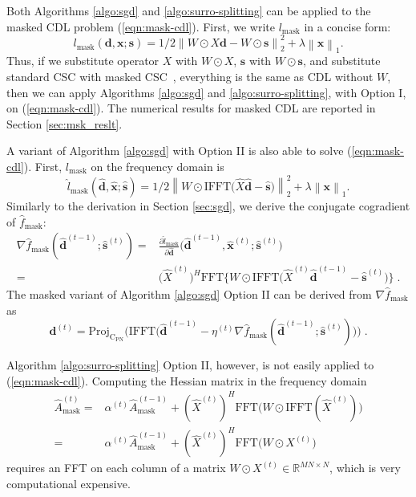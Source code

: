 \documentclass[final]{siamart1116}
\newcommand{\mb}[1]{\mathbf{#1}}
\providecommand{\norm}[1]{\left\lVert#1\right\rVert}
\def \R  {\mathbb{R}}
\begin{document}
Both Algorithms \ref{algo:sgd} and \ref{algo:surro-splitting} can be applied to the masked CDL problem (\ref{eqn:mask-cdl}). First, we write $l_{\text{mask}}$ in a concise form:
\[
l_{\text{mask}}(\mb{d},\mb{x};\mb{s}) = 1/2\norm{W\odot X \mb{d} - W\odot \mb{s}}_2^2 + \lambda\norm{\mb{x}}_1.
\]
Thus, if we substitute operator $X$ with $W\odot X$, $\mb{s}$ with $W\odot \mb{s}$, and substitute standard CSC with masked CSC~\cite{heide-2015-fast, wohlberg-2016-boundary}, everything is the same as CDL without $W$, then we can apply Algorithms \ref{algo:sgd} and \ref{algo:surro-splitting}, with Option I, on (\ref{eqn:mask-cdl}). The numerical results for masked CDL are reported in Section \ref{sec:msk_reslt}.

A variant of Algorithm \ref{algo:sgd} with Option II is also able to solve  (\ref{eqn:mask-cdl}). First, $l_{\text{mask}}$ on the frequency domain is
\[
\hat{l}_{\text{mask}}(\hat{\mb{d}},\hat{\mb{x}};\hat{\mb{s}}) = 1/2\norm{W\odot \text{IFFT}\big(\hat{X} \hat{\mb{d}} -  \hat{\mb{s}}\big)}_2^2 + \lambda\norm{\mb{x}}_1.
\]
Similarly to the derivation in Section \ref{sec:sgd}, we derive the conjugate cogradient of $\hat{f}_{\text{mask}}$:
\[
\begin{aligned}
\nabla \hat{f}_{\text{mask}}(\hat{\mb{d}}^{(t-1)}; \hat{\mb{s}}^{(t)}) =& \frac{\partial \hat{l}_{\text{mask}}}{\partial \hat{\mb{d}}} \big(\hat{\mb{d}}^{(t-1)},\hat{\mb{x}}^{(t)}; \hat{\mb{s}}^{(t)} \big)\\ =& \big(\hat{X}^{(t)}\big)^H \text{FFT} \Big\{W \odot \text{IFFT}\big(\hat{X}^{(t)}\hat{\mb{d}}^{(t-1)}-\hat{\mb{s}}^{(t)}\big)\Big\} \;.
\end{aligned}
\]
The masked variant of Algorithm \ref{algo:sgd} Option II can be derived from $\nabla \hat{f}_{\text{mask}}$ as
\[
\mb{d}^{(t)} = \text{Proj}_{\text{C}_\text{PN}}\bigg(\text{IFFT}\Big(\hat{\mb{d}}^{(t-1)} - \eta^{(t)}\nabla \hat{f}_{\text{mask}}(\hat{\mb{d}}^{(t-1)}; \hat{\mb{s}}^{(t)}) \Big)\bigg) \;.
\]

Algorithm \ref{algo:surro-splitting} Option II, however, is not easily applied to (\ref{eqn:mask-cdl}). Computing the Hessian matrix in the frequency domain
\[
\begin{aligned}\hat{A}^{(t)}_{\text{mask}} =& \alpha^{(t)} \hat{A}^{(t-1)}_{\text{mask}} + (\hat{X}^{(t)})^H \text{FFT} \big( W \odot \text{IFFT}( \hat{X}^{(t)} )\big)\\ =&  \alpha^{(t)} \hat{A}^{(t-1)}_{\text{mask}} + (\hat{X}^{(t)})^H \text{FFT} \big( W \odot X^{(t)} \big)\end{aligned}
\]
requires an FFT on each column of a matrix $W \odot X^{(t)} \in \R^{MN \times N}$, which is very computational expensive.
\end{document}
